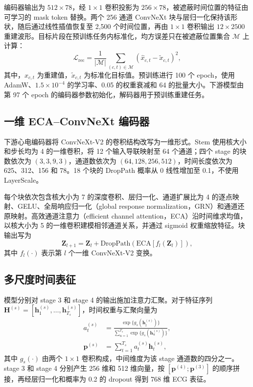 编码器输出为 $512\times78$，经 $1\times1$ 卷积投影为 $256\times78$，被遮蔽时间位置的特征由可学习的 mask token 替换。两个 256 通道 ConvNeXt 块与层归一化保持该形状，随后通过线性插值恢复至 2,500 个时间位置，再由 $1\times1$ 卷积输出 $12\times2500$ 重建波形。目标片段在预训练任务内标准化，均方误差只在被遮蔽位置集合 $\mathcal{M}$ 上计算：
\begin{equation}
\mathcal{L}_{\mathrm{rec}}=
\frac{1}{|\mathcal{M}|}
\sum_{(c,t)\in\mathcal{M}}
\left(\hat{x}_{c,t}-\tilde{x}_{c,t}\right)^2,
\label{eq:pretrain_loss}
\end{equation}
其中，$\hat{x}_{c,t}$ 为重建值，$\tilde{x}_{c,t}$ 为标准化目标值。预训练进行 100 个 epoch，使用 AdamW、$1.5\times10^{-4}$ 的学习率、0.05 的权重衰减和 64 的批量大小。下游模型由第 97 个 epoch 的编码器参数初始化，解码器用于预训练重建任务。

\subsection{一维 ECA--ConvNeXt 编码器}
\label{sec:encoder}

下游心电编码器将 ConvNeXt-V2 的卷积结构改写为一维形式\cite{liu2022convnext,woo2023convnextv2}。Stem 使用核大小和步长均为 4 的一维卷积，将 12 个输入导联映射至 64 个通道；四个 stage 的块数依次为 $(3,3,9,3)$，通道数依次为 $(64,128,256,512)$，时间长度依次为 625、312、156 和 78。18 个块的 DropPath 概率从 0 线性增加至 0.1，不使用 LayerScale。

每个块依次包含核大小为 7 的深度卷积、层归一化、通道扩展比为 4 的逐点映射、GELU、全局响应归一化（global response normalization，GRN）和通道还原映射。高效通道注意力（efficient channel attention，ECA）沿时间维求均值，以核大小为 5 的一维卷积建模相邻通道关系，并通过 sigmoid 权重缩放特征\cite{wang2020ecanet}。块输出写为
\begin{equation}
\mathbf{Z}_{l+1}=\mathbf{Z}_{l}+
\mathrm{DropPath}\!\left(\mathrm{ECA}\!\left[f_l(\mathbf{Z}_{l})\right]\right),
\label{eq:convnext_block}
\end{equation}
其中 $f_l(\cdot)$ 表示第 $l$ 个一维 ConvNeXt-V2 变换。

\subsection{多尺度时间表征}
\label{sec:multiscale}

模型分别对 stage 3 和 stage 4 的输出施加注意力汇聚。对于特征序列 $\mathbf{H}^{(s)}=[\mathbf{h}^{(s)}_1,\ldots,\mathbf{h}^{(s)}_{T_s}]$，时间权重与汇聚向量为
\begin{align}
a^{(s)}_t &=
\frac{\exp\{g_s(\mathbf{h}^{(s)}_t)\}}
{\sum_{u=1}^{T_s}\exp\{g_s(\mathbf{h}^{(s)}_u)\}},\\
\mathbf{p}^{(s)} &= \sum_{t=1}^{T_s}a^{(s)}_t\mathbf{h}^{(s)}_t,
\label{eq:attention_pool}
\end{align}
其中 $g_s(\cdot)$ 由两个 $1\times1$ 卷积构成，中间维度为该 stage 通道数的四分之一。stage 3 和 stage 4 分别产生 256 维和 512 维向量，按 $[\mathbf{p}^{(4)};\mathbf{p}^{(3)}]$ 的顺序拼接，再经层归一化和概率为 0.2 的 dropout 得到 768 维 ECG 表征。

